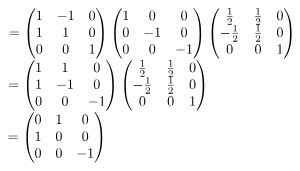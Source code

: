 \documentclass{article}
\newcommand\tab[1][1cm]{\hspace*{#1}}
\begin{document}
$\tab[1.7cm] = \begin{pmatrix}
    1 & -1 & 0\\
    1 & 1 & 0\\
    0 & 0 & 1\\
\end{pmatrix}\begin{pmatrix}
    1 & 0 & 0\\
    0 & -1 & 0\\
    0 & 0 & -1\\
\end{pmatrix}\begin{pmatrix}
    \frac{1}{2} & \frac{1}{2} & 0\\
    -\frac{1}{2} & \frac{1}{2} & 0\\
    0 & 0 & 1\\
\end{pmatrix}$\\
$\tab[1.7cm] = \begin{pmatrix}
    1 & 1 & 0\\
    1 & -1 & 0\\
    0 & 0 & -1\\
\end{pmatrix}\begin{pmatrix}
    \frac{1}{2} & \frac{1}{2} & 0\\
    -\frac{1}{2} & \frac{1}{2} & 0\\
    0 & 0 & 1\\
\end{pmatrix}$\\
$\tab[1.7cm] = \begin{pmatrix}
    0 & 1 & 0\\
    1 & 0 & 0\\
    0 & 0 & -1\\
\end{pmatrix}$
\newpage
\end{document}

